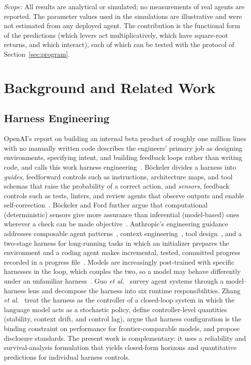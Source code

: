 \documentclass[journal]{IEEEtran}
\begin{document}
\emph{Scope:} All results are analytical or simulated; no measurements of real agents are reported. The parameter values used in the simulations are illustrative and were not estimated from any deployed agent. The contribution is the functional form of the predictions (which levers act multiplicatively, which have square-root returns, and which interact), each of which can be tested with the protocol of Section~\ref{sec:program}.

\section{Background and Related Work}\label{sec:background}

\subsection{Harness Engineering}
OpenAI's report on building an internal beta product of roughly one million lines with no manually written code describes the engineers' primary job as designing environments, specifying intent, and building feedback loops rather than writing code, and calls this work harness engineering~\cite{lopopolo2026}. B\"ockeler divides a harness into \emph{guides}, feedforward controls such as instructions, architecture maps, and tool schemas that raise the probability of a correct action, and \emph{sensors}, feedback controls such as tests, linters, and review agents that observe outputs and enable self-correction~\cite{bockeler2026}. B\"ockeler and Ford further argue that computational (deterministic) sensors give more assurance than inferential (model-based) ones wherever a check can be made objective~\cite{bockeler2026b}. Anthropic's engineering guidance addresses composable agent patterns~\cite{anthropic2024}, context engineering~\cite{anthropic2025ctx}, tool design~\cite{anthropic2025tools}, and a two-stage harness for long-running tasks in which an initializer prepares the environment and a coding agent makes incremental, tested, committed progress recorded in a progress file~\cite{anthropic2025long}. Models are increasingly post-trained with specific harnesses in the loop, which couples the two, so a model may behave differently under an unfamiliar harness~\cite{oreilly2026}. Guo \emph{et al.}~\cite{guo2026survey} survey agent systems through a model--harness lens and decompose the harness into six runtime responsibilities. Zhang \emph{et al.}~\cite{zhang2026disclose} treat the harness as the controller of a closed-loop system in which the language model acts as a stochastic policy, define controller-level quantities (stability, context drift, and control lag), argue that harness configuration is the binding constraint on performance for frontier-comparable models, and propose disclosure standards. The present work is complementary: it uses a reliability and survival-analysis formulation that yields closed-form horizons and quantitative predictions for individual harness controls.
\end{document}
